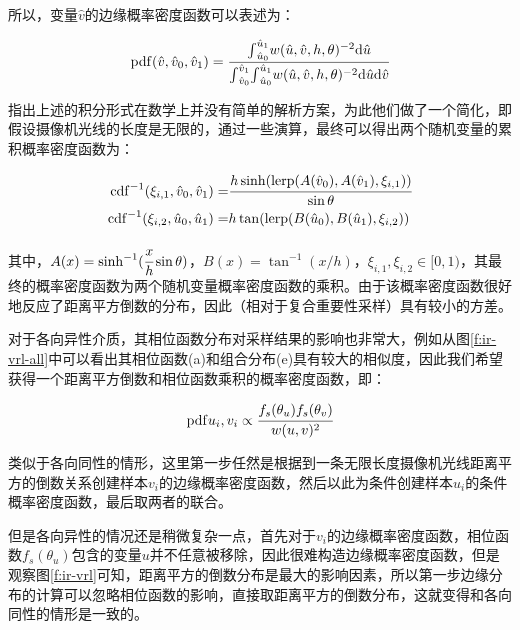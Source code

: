 所以，变量$\hat{v}$的边缘概率密度函数可以表述为：

\begin{equation}
	{\rm pdf}(\hat{v},\hat{v}_0,\hat{v}_1)= \cfrac{{\rm \int}^{\hat{u}_1}_{\hat{u}_0} w(\hat{u},\hat{v},h,\theta)^{-2}{\rm d}\hat{u}}{{\rm \int}^{\hat{v}_1}_{\hat{v}_0}{\rm \int}^{\hat{u}_1}_{\hat{u}_0} w(\hat{u},\hat{v},h,\theta)^{-2}{\rm d}\hat{u}{\rm d}\hat{v}}
\end{equation}

\noindent \cite{a:VirtualRayLightsforRenderingSceneswithParticipatingMedia}指出上述的积分形式在数学上并没有简单的解析方案，为此他们做了一个简化，即假设摄像机光线的长度是无限的，通过一些演算，最终可以得出两个随机变量的累积概率密度函数为：

\begin{equation}
\begin{aligned}
	{\rm cdf}^{-1}(\xi_{i,1},\hat{v}_0,\hat{v}_1)=& \cfrac{h\sinh(\text{lerp}(A(\hat{v}_0),A(\hat{v}_1),\xi_{i,1}))}{\sin\theta}\\
	{\rm cdf}^{-1}(\xi_{i,2},\hat{u}_0,\hat{u}_1)=&h\tan(\text{lerp}(B(\hat{u}_0),B(\hat{u}_1),\xi_{i,2}))
\end{aligned}	
\end{equation}

\noindent 其中，$A(x)=\sinh^{-1}( \cfrac{x}{h}\sin\theta)$，$B(x)=\tan^{-1}(x/h)$，$\xi_{i,1},\xi_{i,2}\in[0,1)$，其最终的概率密度函数为两个随机变量概率密度函数的乘积。由于该概率密度函数很好地反应了距离平方倒数的分布，因此（相对于复合重要性采样）具有较小的方差。

对于各向异性介质，其相位函数分布对采样结果的影响也非常大，例如从图\ref{f:ir-vrl-all}中可以看出其相位函数(a)和组合分布(e)具有较大的相似度，因此我们希望获得一个距离平方倒数和相位函数乘积的概率密度函数，即：

\begin{equation}
	{\rm pdf}{u_i,v_i}\propto \cfrac{f_s(\theta_u)f_s(\theta_v)}{w(u,v)^{2}}
\end{equation}

\noindent 类似于各向同性的情形，这里第一步任然是根据到一条无限长度摄像机光线距离平方的倒数关系创建样本$v_i$的边缘概率密度函数，然后以此为条件创建样本$u_i$的条件概率密度函数，最后取两者的联合。

但是各向异性的情况还是稍微复杂一点，首先对于$v_i$的边缘概率密度函数，相位函数$f_s(\theta_u)$包含的变量$u$并不任意被移除，因此很难构造边缘概率密度函数，但是观察图\ref{f:ir-vrl}可知，距离平方的倒数分布是最大的影响因素，所以第一步边缘分布的计算可以忽略相位函数的影响，直接取距离平方的倒数分布，这就变得和各向同性的情形是一致的。

